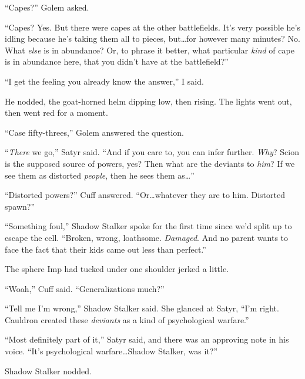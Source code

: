 ``Capes?'' Golem asked.



``Capes?  Yes.  But there were capes at the other battlefields.  It's very possible he's idling because he's taking them all to pieces, but\ldots for however many minutes?  No.  What \emph{else} is in abundance?  Or, to phrase it better, what particular \emph{kind} of cape is in abundance here, that you didn't have at the battlefield?''



``I get the feeling you already know the answer,'' I said.



He nodded, the goat-horned helm dipping low, then rising.  The lights went out, then went red for a moment.



``Case fifty-threes,'' Golem answered the question.



``\emph{There} we go,'' Satyr said.  ``And if you care to, you can infer further.  \emph{Why}?  Scion is the supposed source of powers, yes?  Then what are the deviants to \emph{him}?  If we see them as distorted \emph{people}, then he sees them as\ldots''



``Distorted powers?''  Cuff answered.  ``Or\ldots whatever they are to him.  Distorted spawn?''



``Something foul,'' Shadow Stalker spoke for the first time since we'd split up to escape the cell.  ``Broken, wrong, loathsome.  \emph{Damaged}.  And no parent wants to face the fact that their kids came out less than perfect.''



The sphere Imp had tucked under one shoulder jerked a little.



``Woah,'' Cuff said.  ``Generalizations much?''



``Tell me I'm wrong,'' Shadow Stalker said.  She glanced at Satyr, ``I'm right.  Cauldron created these \emph{deviants }as a kind of psychological warfare.''



``Most definitely part of it,'' Satyr said, and there was an approving note in his voice.  ``It's psychological warfare\ldots Shadow Stalker, was it?''



Shadow Stalker nodded.



